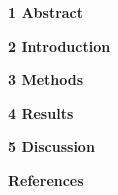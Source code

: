 \documentclass[a4paper,12pt]{article}
\begin{document}
\noindent \textbf{1 Abstract}

\lipsum[1]

\noindent \textbf{2 Introduction}

\lipsum[2]

\noindent \textbf{3 Methods}

\lipsum[3]

\noindent \textbf{4 Results}

\lipsum[4]

\noindent \textbf{5 Discussion}

\lipsum[5]

\noindent \textbf{References}

\lipsum[6]
\end{document}

